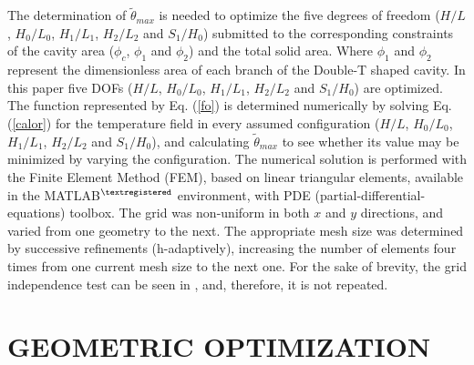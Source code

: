 \documentclass[12pt,fleqn]{article}
\begin{document}
The determination of $\tilde{\theta}_{max}$ is needed to optimize the five degrees of freedom ($H/L$, $H_{0}/L_{0}$, $H_{1}/L_{1}$, $H_{2}/L_{2}$ and $S_{1}/H_{0}$) submitted to the corresponding constraints of the cavity area ($\phi_{c}$, $\phi_{1}$ and $\phi_{2}$) and the total solid area. Where $\phi_{1}$ and $\phi_{2}$ represent the dimensionless area of each branch of the Double-T shaped cavity. In this paper five DOFs ($H/L$, $H_{0}/L_{0}$, $H_{1}/L_{1}$, $H_{2}/L_{2}$ and $S_{1}/H_{0}$) are optimized. The function represented by Eq. (\ref{fo}) is determined numerically by solving Eq. (\ref{calor}) for the temperature field in every assumed configuration ($H/L$, $H_{0}/L_{0}$, $H_{1}/L_{1}$, $H_{2}/L_{2}$ and $S_{1}/H_{0}$), and calculating $\tilde{\theta}_{max}$ to see whether its value may be minimized by varying the configuration. The numerical solution is performed with the Finite Element Method (FEM)\citep{Reddy1994}, based on linear triangular elements, available in the MATLAB$^{\tiny ®}$ environment, with PDE (partial-differential-equations) toolbox. The grid was non-uniform in both $x$ and $y$ directions, and varied from one geometry to the next. The appropriate mesh size was determined by successive refinements (h-adaptively), increasing the number of elements four times from one current mesh size to the next one. For the sake of brevity, the grid independence test can be seen in \cite{Gonzales2015b}, and, therefore, it is not repeated.

\section{GEOMETRIC OPTIMIZATION}
\end{document}
